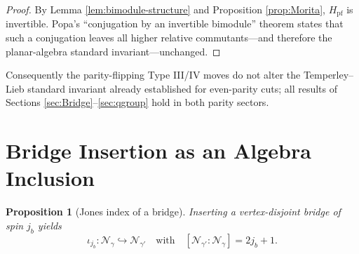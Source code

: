 \documentclass[11pt]{article}
\newtheorem{proposition}{Proposition}[section]
\begin{document}
\begin{proof}
By Lemma \ref{lem:bimodule-structure} and
Proposition \ref{prop:Morita},
$H_{\mathrm{pf}}$ is invertible.
Popa’s “conjugation by an invertible bimodule” theorem
\cite[Prop.\,2.3]{PopaMorita} states that such a conjugation
leaves all higher relative commutants—and therefore
the planar-algebra standard invariant—unchanged.
\end{proof}

\noindent
Consequently the parity-flipping Type III/IV moves do not alter the
Temperley–Lieb standard invariant already established for even-parity
cuts; all results of Sections \ref{sec:Bridge}–\ref{sec:qgroup} hold in
both parity sectors.


\section{Bridge Insertion as an Algebra Inclusion}

\begin{proposition}[Jones index of a bridge]
Inserting a vertex-disjoint bridge of spin $j_b$ yields
\[
  \iota_{j_b}:\mathcal N_{\gamma}\hookrightarrow \mathcal N_{\gamma'}
\quad\text{with}\quad
  [\mathcal N_{\gamma'}:\mathcal N_{\gamma}] = 2j_b+1.
\]
\end{proposition}
\end{document}
